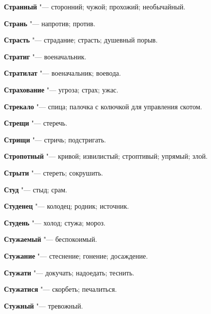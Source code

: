 \begin{mymulticols}{2}
\noindent\textbf{Странный} "--- сторонний; чужой; прохожий; необычайный. 




\noindent\textbf{Странь} "--- напротив; против. 




\noindent\textbf{Страсть} "--- страдание; страсть; душевный порыв. 




\noindent\textbf{Стратиг} "--- военачальник. 




\noindent\textbf{Стратилат} "--- военачальник; воевода. 




\noindent\textbf{Страхование} "--- угроза; страх; ужас. 




\noindent\textbf{Стрекало} "--- спица; палочка с колючкой для управления скотом. 




\noindent\textbf{Стрещи} "--- стеречь. 




\noindent\textbf{Стрищи} "--- стричь; подстригать. 




\noindent\textbf{Стропотный} "--- кривой; извилистый; строптивый; упрямый; злой. 




\noindent\textbf{Стрыти} "--- стереть; сокрушить. 




\noindent\textbf{Студ} "--- стыд; срам. 




\noindent\textbf{Студенец} "--- колодец; родник; источник. 




\noindent\textbf{Студень} "--- холод; стужа; мороз. 




\noindent\textbf{Стужаемый} "--- беспокоимый. 




\noindent\textbf{Стужание} "--- стеснение; гонение; досаждение. 




\noindent\textbf{Стужати} "--- докучать; надоедать; теснить. 




\noindent\textbf{Стужатися} "--- скорбеть; печалиться. 




\noindent\textbf{Стужный} "--- тревожный. 





\end{mymulticols}
